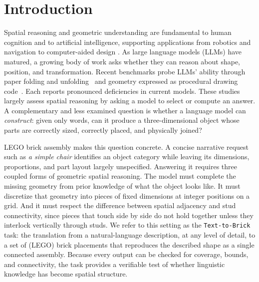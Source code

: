 
\section{Introduction}
Spatial reasoning and geometric understanding are fundamental to human cognition and to artificial intelligence, supporting applications from robotics and navigation to computer-aided design \cite{xia2026buildarena}.
As large language models (LLMs) have matured, a growing body of work asks whether they can reason about shape, position, and transformation. Recent benchmarks probe LLMs' ability through 
paper folding and unfolding~\cite{zhou2026paperfoldingpuzzle} and geometry expressed as procedural drawing code~\cite{luo2026geogrambench}. Each reports pronounced deficiencies in current models. These studies largely assess spatial reasoning by asking a model to select or compute an answer. A complementary and less examined question is whether a language model can \emph{construct}: given only words, can it produce a three-dimensional object whose parts are correctly sized, correctly placed, and physically joined?

LEGO brick assembly makes this question concrete. A concise narrative request such as \emph{a simple chair} identifies an object category while leaving its dimensions, proportions, and part layout largely unspecified. Answering it requires three coupled forms of geometric spatial reasoning. The model must complete the missing geometry from prior knowledge of what the object looks like. It must discretize that geometry into pieces of fixed dimensions at integer positions on a grid. And it must respect the difference between spatial adjacency and stud connectivity, since pieces that touch side by side do not hold together unless they interlock vertically through studs. We refer to this setting as the \texttt{Text-to-Brick} task: the translation from a natural-language description, at any level of detail, to a set of (LEGO) brick placements that reproduces the described shape as a single connected assembly. Because every output can be checked for coverage, bounds, and connectivity, the task provides a verifiable test of whether linguistic knowledge has become spatial structure.

